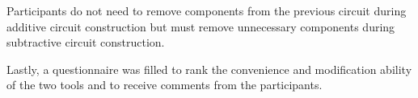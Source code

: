 Participants do not need to remove components from the previous circuit during additive circuit construction but must remove unnecessary components during subtractive circuit construction.

Lastly, a questionnaire was filled to rank the convenience and modification ability of the two tools and to receive comments from the participants.







